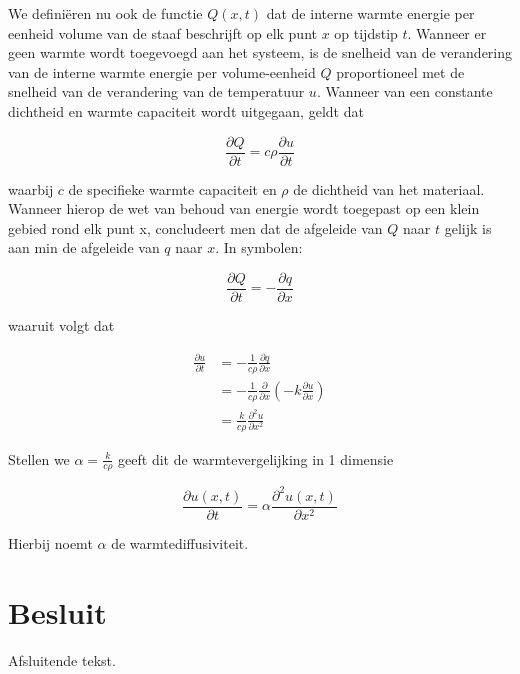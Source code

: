 \documentclass[a4paper,kulak]{kulakarticle} %
\begin{document}
We definiëren nu ook de functie $Q(x, t)$ dat de interne warmte energie per eenheid volume van de staaf beschrijft op elk punt $x$ op tijdstip $t$. Wanneer er geen warmte wordt toegevoegd aan het systeem, is de snelheid van de verandering van de interne warmte energie per volume-eenheid $Q$ proportioneel met de snelheid van de verandering van de temperatuur $u$. Wanneer van een constante dichtheid en warmte capaciteit wordt uitgegaan, geldt dat

\begin{equation}
	\frac{\partial Q}{\partial t} = c \rho \frac{\partial u}{\partial t}
\end{equation}

waarbij $c$ de specifieke warmte capaciteit en $\rho$ de dichtheid van het materiaal. 
Wanneer hierop de wet van behoud van energie wordt toegepast op een klein gebied rond elk punt x, concludeert men dat de afgeleide van $Q$ naar $t$ gelijk is aan min de afgeleide van $q$ naar $x$. In symbolen:

\begin{equation}
	\frac{\partial Q}{\partial t} = - \frac{\partial q}{\partial x}
\end{equation}

waaruit volgt dat

\begin{equation}
	\begin{split}
	\frac{\partial u}{\partial t} &= - \frac{1}{c\rho} \frac{\partial q}{\partial x} \\
	&= - \frac{1}{c\rho} \frac{\partial}{\partial x} 
		\left( - k \frac{\partial u}{\partial x} \right) \\
	&= \frac{k}{c\rho} \frac{\partial^2u}{\partial x^2}
	\end{split}
\end{equation}

Stellen we $\alpha = \frac{k}{c \rho}$ geeft dit de warmtevergelijking in 1 dimensie

\begin{equation}
	\frac{\partial u(x, t)}{\partial t} = \alpha \frac{\partial^2u(x, t)}{\partial x^2}
\end{equation}

Hierbij noemt $\alpha$ de warmtediffusiviteit.

\section*{Besluit}

Afsluitende tekst.
\end{document}
